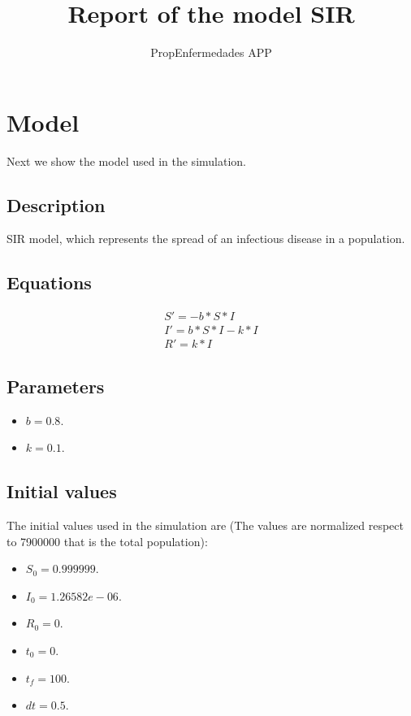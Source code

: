 \documentclass{article}
\title{Report of the model SIR}
\author{PropEnfermedades APP}
\date{}
\begin{document}
\maketitle
\section{Model}
Next we show the model used in the simulation.
\subsection*{Description}
SIR model, which represents the spread of an infectious disease in a population.
\subsection*{Equations}
\begin{equation}
\begin{split}
S' = -b * S * I \\ I' = b * S * I - k * I \\ R' = k * I
\end{split}
\end{equation}
\subsection*{Parameters}
\begin{itemize}
\item $b = 0.8$. 
\item $k = 0.1$. 
\end{itemize}
\subsection*{Initial values}
The initial values used in the simulation are (The values are normalized respect to 7900000 that is the total population):
\begin{itemize}
\item $S_0 = 0.999999$. 
\item $I_0 = 1.26582e-06$. 
\item $R_0 = 0$. 
\item $t_0 = 0$. 
\item $t_f = 100$. 
\item $dt = 0.5$. 
\end{itemize}
\end{document}
